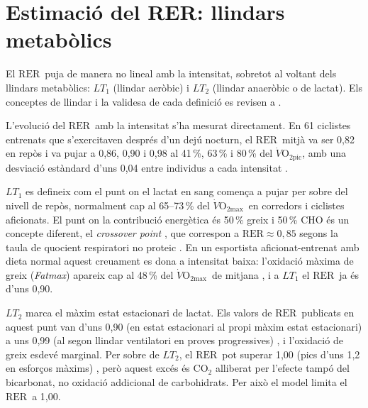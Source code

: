 \documentclass[10pt,a4paper]{article}
\newcommand{\VOmax}{\ensuremath{\dot V\mathrm{O_{2max}}}}
\newcommand{\RER}{\ensuremath{\mathrm{RER}}}
\begin{document}
\section{Estimació del RER: llindars metabòlics}\label{sec:rer}

El \RER\ puja de manera no lineal amb la intensitat, sobretot al voltant dels
llindars metabòlics: $LT_1$ (llindar aeròbic) i $LT_2$ (llindar anaeròbic o de
lactat). Els conceptes de llindar i la validesa de cada definició es revisen a
\citet{faude2009}.

L'evolució del \RER\ amb la intensitat s'ha mesurat directament. En 61 ciclistes
entrenats que s'exercitaven després d'un dejú nocturn, el \RER\ mitjà va ser 0,82
en repòs i va pujar a 0,86, 0,90 i 0,98 al 41\,\%, 63\,\% i 80\,\% del
$\dot V\mathrm{O_{2pic}}$, amb una desviació estàndard d'uns 0,04 entre individus
a cada intensitat \citep{goedecke2000}.

$LT_1$ es defineix com el punt on el lactat en sang comença a pujar per sobre del
nivell de repòs, normalment cap al 65--73\,\% del \VOmax\ en corredors i ciclistes
aficionats. El punt on la contribució energètica és 50\,\% greix i 50\,\% CHO és un
concepte diferent, el \emph{crossover point} \citep{brooks1994}, que correspon a
$\RER\approx0{,}85$ segons la taula de quocient respiratori no proteic
\citep{peronnet1991}. En un esportista aficionat-entrenat amb dieta normal aquest
creuament es dona a intensitat baixa: l'oxidació màxima de greix (\emph{Fatmax})
apareix cap al 48\,\% del \VOmax\ de mitjana \citep{venables2005}, i a $LT_1$ el
\RER\ ja és d'uns 0,90.

$LT_2$ marca el màxim estat estacionari de lactat. Els valors de \RER\ publicats en
aquest punt van d'uns 0,90 (en estat estacionari al propi màxim estat estacionari)
a uns 0,99 (al segon llindar ventilatori en proves progressives)
\citep{peinado2016}, i l'oxidació de greix esdevé marginal. Per sobre de $LT_2$, el
\RER\ pot superar 1,00 (pics d'uns 1,2 en esforços màxims) \citep{edvardsen2014},
però aquest excés és CO$_2$ alliberat per l'efecte tampó del bicarbonat, no
oxidació addicional de carbohidrats. Per això el model limita el \RER\ a 1,00.
\end{document}
